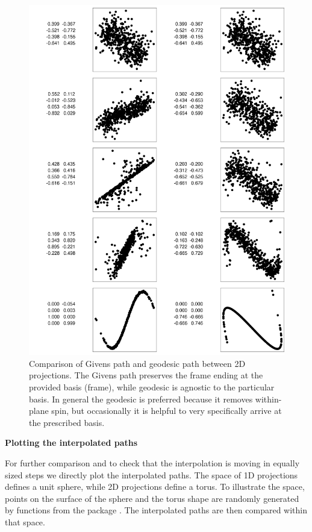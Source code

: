 \begin{Schunk}
\begin{figure}

{\centering \includegraphics[width=0.8\linewidth]{compare-paths} 

}

\caption[Comparison of Givens path and geodesic path between 2D projections]{Comparison of Givens path and geodesic path between 2D projections. The Givens path preserves the frame ending at the provided basis (frame), while geodesic is agnostic to the particular basis. In general the geodesic is preferred because it removes within-plane spin, but occasionally it is helpful to very specifically arrive at the prescribed basis.}\label{fig:compare-paths}
\end{figure}
\end{Schunk}

\textbf{Plotting the interpolated paths}

For further comparison and to check that the interpolation is moving in
equally sized steps we directly plot the interpolated paths. The space
of 1D projections defines a unit sphere, while 2D projections define a
torus. To illustrate the space, points on the surface of the sphere and
the torus shape are randomly generated by functions from the
 package \citep{geozoo}. The interpolated paths are then
compared within that space.

